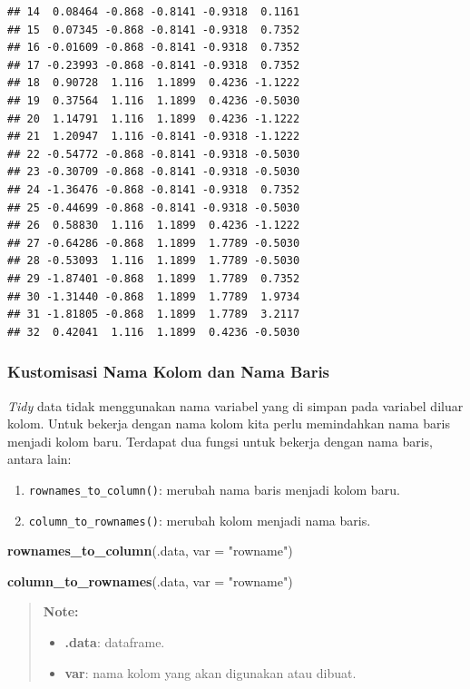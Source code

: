 \documentclass[]{book}
\newenvironment{Shaded}{\begin{snugshade}}{\end{snugshade}}
\newcommand{\KeywordTok}[1]{\textcolor[rgb]{0.13,0.29,0.53}{\textbf{#1}}}
\newcommand{\DataTypeTok}[1]{\textcolor[rgb]{0.13,0.29,0.53}{#1}}
\newcommand{\StringTok}[1]{\textcolor[rgb]{0.31,0.60,0.02}{#1}}
\newcommand{\NormalTok}[1]{#1}
\providecommand{\tightlist}{%
  \setlength{\itemsep}{0pt}\setlength{\parskip}{0pt}}
\begin{document}
\begin{verbatim}
## 14  0.08464 -0.868 -0.8141 -0.9318  0.1161
## 15  0.07345 -0.868 -0.8141 -0.9318  0.7352
## 16 -0.01609 -0.868 -0.8141 -0.9318  0.7352
## 17 -0.23993 -0.868 -0.8141 -0.9318  0.7352
## 18  0.90728  1.116  1.1899  0.4236 -1.1222
## 19  0.37564  1.116  1.1899  0.4236 -0.5030
## 20  1.14791  1.116  1.1899  0.4236 -1.1222
## 21  1.20947  1.116 -0.8141 -0.9318 -1.1222
## 22 -0.54772 -0.868 -0.8141 -0.9318 -0.5030
## 23 -0.30709 -0.868 -0.8141 -0.9318 -0.5030
## 24 -1.36476 -0.868 -0.8141 -0.9318  0.7352
## 25 -0.44699 -0.868 -0.8141 -0.9318 -0.5030
## 26  0.58830  1.116  1.1899  0.4236 -1.1222
## 27 -0.64286 -0.868  1.1899  1.7789 -0.5030
## 28 -0.53093  1.116  1.1899  1.7789 -0.5030
## 29 -1.87401 -0.868  1.1899  1.7789  0.7352
## 30 -1.31440 -0.868  1.1899  1.7789  1.9734
## 31 -1.81805 -0.868  1.1899  1.7789  3.2117
## 32  0.42041  1.116  1.1899  0.4236 -0.5030
\end{verbatim}

\subsubsection{Kustomisasi Nama Kolom dan Nama
Baris}\label{kustomisasi-nama-kolom-dan-nama-baris}

\emph{Tidy} data tidak menggunakan nama variabel yang di simpan pada
variabel diluar kolom. Untuk bekerja dengan nama kolom kita perlu
memindahkan nama baris menjadi kolom baru. Terdapat dua fungsi untuk
bekerja dengan nama baris, antara lain:

\begin{enumerate}
\def\labelenumi{\arabic{enumi}.}
\tightlist
\item
  \texttt{rownames\_to\_column()}: merubah nama baris menjadi kolom
  baru.
\item
  \texttt{column\_to\_rownames()}: merubah kolom menjadi nama baris.
\end{enumerate}

\begin{Shaded}
\begin{Highlighting}[]
\KeywordTok{rownames_to_column}\NormalTok{(.data, }\DataTypeTok{var =} \StringTok{"rowname"}\NormalTok{)}

\KeywordTok{column_to_rownames}\NormalTok{(.data, }\DataTypeTok{var =} \StringTok{"rowname"}\NormalTok{)}
\end{Highlighting}
\end{Shaded}

\begin{quote}
\textbf{Note: }

\begin{itemize}
\tightlist
\item
  \textbf{.data}: dataframe.
\item
  \textbf{var}: nama kolom yang akan digunakan atau dibuat.
\end{itemize}
\end{quote}
\end{document}
